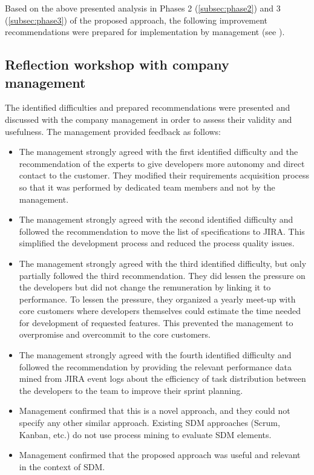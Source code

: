 Based on the above presented analysis in Phases 2 (\cref{subsec:phase2}) and 3 (\cref{subsec:phase3}) of the proposed approach, the following improvement recommendations were prepared for implementation by management (see ). 



\subsection{Reflection workshop with company management}

The identified difficulties and prepared recommendations were presented and discussed with the company management in order to assess their validity and usefulness. The management provided feedback as follows:

\begin{itemize}
	\item The management strongly agreed with the first identified difficulty and the recommendation of the experts to give developers more autonomy and direct contact to the customer. They modified their requirements acquisition process so that it was performed by dedicated team members and not by the management.
	
	\item The management strongly agreed with the second identified difficulty and followed the recommendation to move the list of specifications to JIRA. This simplified the development process and reduced the process quality issues.
	
	\item The management strongly agreed with the third identified difficulty, but only partially followed the third recommendation. They did lessen the pressure on the developers but did not change the remuneration by linking it to performance. To lessen the pressure, they organized a yearly meet-up with core customers where developers themselves could estimate the time needed for development of requested features.  This prevented the management to overpromise and overcommit to the core customers.
	
	\item The management strongly agreed with the fourth identified difficulty and followed the recommendation by providing the relevant performance data mined from JIRA event logs about the efficiency of task distribution between the developers to the team to improve their sprint planning.
	
	\item Management confirmed that this is a novel approach, and they could not specify any other similar approach. Existing SDM approaches (Scrum, Kanban, etc.) do not use process mining to evaluate SDM elements. 
	
	\item Management confirmed that the proposed approach was useful and relevant in the context of SDM.
	
\end{itemize}
	
